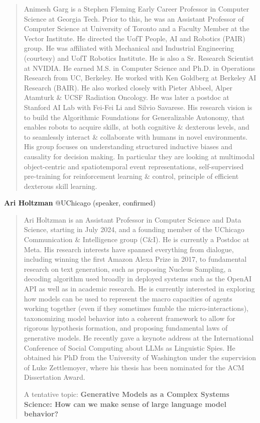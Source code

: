 \documentclass[10pt]{article} %
\newcounter{exa}
\begin{document}
\begin{quote}
    Animesh Garg is a Stephen Fleming Early Career Professor in Computer Science at Georgia Tech. Prior to this, he was an Assistant Professor of Computer Science at University of Toronto and a Faculty Member at the Vector Institute. He directed the UofT People, AI and Robotics (PAIR) group. He was affiliated with Mechanical and Industrial Engineering (courtesy) and UofT Robotics Institute. He is also a Sr. Research Scientist at NVIDIA. He earned M.S. in Computer Science and Ph.D. in Operations Research from UC, Berkeley. He worked with Ken Goldberg at Berkeley AI Research (BAIR). He also worked closely with Pieter Abbeel, Alper Atamturk \& UCSF Radiation Oncology. He was later a postdoc at Stanford AI Lab with Fei-Fei Li and Silvio Savarese. His research vision is to build the Algorithmic Foundations for Generalizable Autonomy, that enables robots to acquire skills, at both cognitive \& dexterous levels, and to seamlessly interact \& collaborate with humans in novel environments. His group focuses on understanding structured inductive biases and causality for decision making. In particular they are looking at multimodal object-centric and spatiotemporal event representations, self-supervised pre-training for reinforcement learning \& control, principle of efficient dexterous skill learning.
\end{quote}



\textbf{Ari Holtzman} @UChicago (speaker, confirmed)  

\begin{quote}
    Ari Holtzman is an Assistant Professor in Computer Science and Data Science, starting in July 2024, and a founding member of the UChicago Communication \& Intelligence group (C\&I). He is currently a Postdoc at Meta. His research interests have spanned everything from dialogue, including winning the first Amazon Alexa Prize in 2017, to fundamental research on text generation, such as proposing Nucleus Sampling, a decoding algorithm used broadly in deployed systems such as the OpenAI API as well as in academic research.  He is currently interested in exploring how models can be used to represent the macro capacities of agents working together (even if they sometimes fumble the micro-interactions), taxonomizing model behavior into a coherent framework to allow for rigorous hypothesis formation, and proposing fundamental laws of generative models. He recently gave a keynote address at the International Conference of Social Computing about LLMs as Linguistic Spies. He obtained his PhD from the University of Washington under the supervision of Luke Zettlemoyer, where his thesis has been nominated for the ACM Dissertation Award.  

A tentative topic: \textbf{Generative Models as a Complex Systems Science: How can we make sense of large language model behavior?}
\end{quote}
\end{document}
